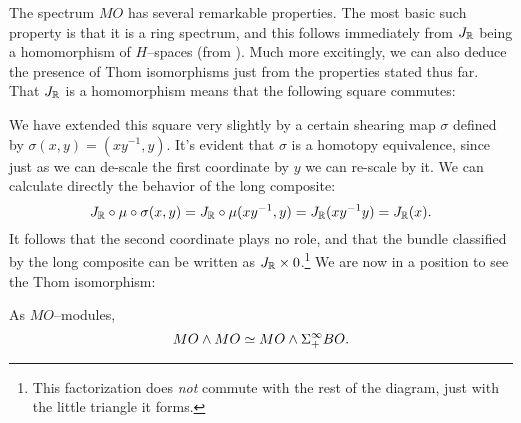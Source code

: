 The spectrum $MO$ has several remarkable properties.  The most basic such property is that it is a ring spectrum, and this follows immediately from $J_{\mathbb R}$ being a homomorphism of $H$--spaces (from ).  Much more excitingly, we can also deduce the presence of Thom isomorphisms just from the properties stated thus far.  That $J_{\mathbb R}$ is a homomorphism means that the following square commutes:
\begin{center}
\end{center}
We have extended this square very slightly by a certain shearing map $\sigma$ defined by $\sigma(x, y) = (xy^{-1}, y)$.    It's evident that $\sigma$ is a homotopy equivalence, since just as we can de-scale the first coordinate by $y$ we can re-scale by it.  We can calculate directly the behavior of the long composite: \[J_{\mathbb R} \circ \mu \circ \sigma(x, y) = J_{\mathbb R} \circ \mu(xy^{-1}, y) = J_{\mathbb R}(xy^{-1}y) = J_{\mathbb R}(x).\]  It follows that the second coordinate plays no role, and that the bundle classified by the long composite can be written as $J_{\mathbb R} \times 0$.\footnote{This factorization does \emph{not} commute with the rest of the diagram, just with the little triangle it forms.}   We are now in a position to see the Thom isomorphism:
\begin{lemma} As $MO$--modules, \[MO \wedge MO \simeq MO \wedge \Sigma^\infty_+ BO.\]
\end{lemma}
